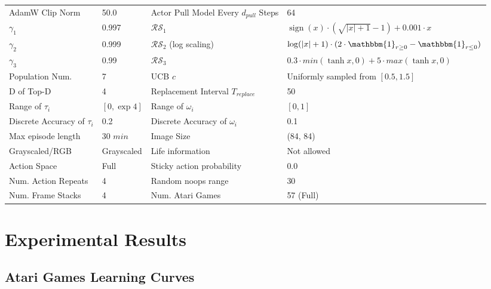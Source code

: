 \begin{table}[H]
\begin{center}
{\begin{tabular}{l l l l }
AdamW Clip Norm & 50.0  & Actor Pull Model Every $d_{pull}$ Steps & 64 \\



$\gamma_1$ & 0.997  &  $\mathcal{RS}_1$ &$ \operatorname{sign}(x) \cdot (\sqrt{|x|+1}-1)+0.001 \cdot x$\\

$\gamma_2$ & 0.999  & $\mathcal{RS}_2$ (log scaling) & $ \log(|x|+1) \cdot (2 \cdot \mathbbm{1}_{r\geq0} - \mathbbm{1}_{r\le 0})$ \\ 

$\gamma_3$ & 0.99 &  $\mathcal{RS}_3$  & $0.3 \cdot min(\tanh{x},0) + 5\cdot max(\tanh{x},0)$ \\ 

Population Num.   & 7  &  UCB $c$ & Uniformly sampled from $[0.5,1.5]$\\ 

D of Top-D  & 4 & Replacement Interval $T_{replace}$  & 50   \\
Range of $\tau_i$ & $[0,\exp{4}]$  & Range of $\omega_i$ & $[0,1]$\\ 
Discrete Accuracy of $\tau_i$ & 0.2 & Discrete Accuracy of $\omega_i$ & 0.1 \\
Max episode length   & 30 $min$ & Image Size & (84, 84) \\
Grayscaled/RGB      & Grayscaled & Life information & Not allowed  \\
Action Space & Full & Sticky action probability  & 0.0 \\
Num. Action Repeats & 4 & Random noops range  & 30\\
Num. Frame Stacks & 4 & Num. Atari Games & 57 (Full)\\
\bottomrule
\end{tabular} 
}
\end{center}
\end{table}



\clearpage



\section{Experimental Results}
\label{appendix: experiment results}




\subsection{Atari Games Learning Curves}




